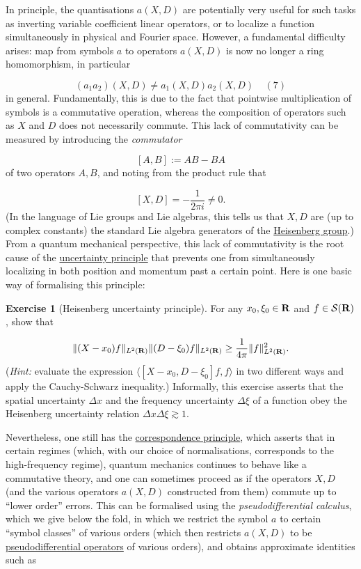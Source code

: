 \documentclass[11pt]{article}
\theoremstyle{definition}
\newtheorem{exercise}[theorem]{Exercise}
\theoremstyle{remark}
\begin{document}
In principle, the quantisations \({a(X,D)}\) are potentially very useful for such tasks as inverting variable coefficient linear operators, or to localize a function simultaneously in physical and Fourier space. However, a fundamental difficulty arises: map from symbols \({a}\) to operators \({a(X,D)}\) is now no longer a ring homomorphism, in particular \label{ringho}

\[\displaystyle  (a_1 a_2)(X,D) \neq a_1(X,D) a_2(X,D) \ \ \ \ \ (7)\]
 in general. Fundamentally, this is due to the fact that pointwise multiplication of symbols is a commutative operation, whereas the composition of operators such as \({X}\) and \({D}\) does not necessarily commute. This lack of commutativity can be measured by introducing the \emph{commutator} 

\[\displaystyle  [A,B] := AB - BA\]
 of two operators \({A,B}\), and noting from the product rule that 

\[\displaystyle  [X,D] = -\frac{1}{2\pi i} \neq 0.\]
 (In the language of Lie groups and Lie algebras, this tells us that \({X,D}\) are (up to complex constants) the standard Lie algebra generators of the \href{https://en.wikipedia.org/wiki/Heisenberg_group}{Heisenberg group}.) From a quantum mechanical perspective, this lack of commutativity is the root cause of the \href{https://en.wikipedia.org/wiki/Uncertainty_principle}{uncertainty principle} that prevents one from simultaneously localizing in both position and momentum past a certain point. Here is one basic way of formalising this principle:

\begin{exercise}[Heisenberg uncertainty principle]
 \label{hup} For any \({x_0, \xi_0 \in {\bf R}}\) and \({f \in \mathcal{S}({\bf R})}\), show that 

\[\displaystyle  \| (X-x_0) f \|_{L^2({\bf R})} \| (D-\xi_0) f\|_{L^2({\bf R})} \geq \frac{1}{4\pi} \|f\|_{L^2({\bf R})}^2.\]
 (\emph{Hint:} evaluate the expression \({\langle [X-x_0, D - \xi_0] f, f \rangle}\) in two different ways and apply the Cauchy-Schwarz inequality.) Informally, this exercise asserts that the spatial uncertainty \({\Delta x}\) and the frequency uncertainty \({\Delta \xi}\) of a function obey the Heisenberg uncertainty relation \({\Delta x \Delta \xi \gtrsim 1}\). 

\end{exercise}

 Nevertheless, one still has the \href{https://en.wikipedia.org/wiki/Correspondence_principle}{correspondence principle}, which asserts that in certain regimes (which, with our choice of normalisations, corresponds to the high-frequency regime), quantum mechanics continues to behave like a commutative theory, and one can sometimes proceed as if the operators \({X,D}\) (and the various operators \({a(X,D)}\) constructed from them) commute up to “lower order” errors. This can be formalised using the \emph{pseudodifferential calculus}, which we give below the fold, in which we restrict the symbol \({a}\) to certain “symbol classes” of various orders (which then restricts \({a(X,D)}\) to be \href{https://en.wikipedia.org/wiki/Pseudo-differential_operator}{pseudodifferential operators} of various orders), and obtains approximate identities such as 
\end{document}
